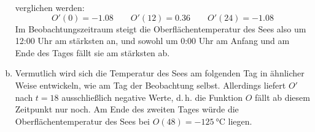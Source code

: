 \begin{exercise}
\begin{enumerate}[a)]
            verglichen werden:
            \begin{equation*}
              O'(\num{0})=-\num{1.08}
              \qquad
              O'(\num{12})=\num{0.36}
              \qquad
              O'(\num{24})=-\num{1.08}
            \end{equation*}
            Im Beobachtungszeitraum steigt die
            Oberflächentemperatur des Sees also
            um 12:00 Uhr am stärksten an, und
            sowohl um 0:00 Uhr am Anfang und am
            Ende des Tages fällt sie am stärksten ab.
      \item Vermutlich wird sich die Temperatur
            des Sees am folgenden Tag in ähnlicher
            Weise entwickeln, wie am Tag der
            Beobachtung selbst.
            Allerdings liefert $O'$ nach $t=18$
            ausschließlich negative Werte, d.\,h.
            die Funktion $O$ fällt ab diesem
            Zeitpunkt nur noch.
            Am Ende des zweiten Tages würde die
            Oberflächentemperatur des Sees bei
            $O(48)=\SI{-125}{\celsius}$ liegen.
    \end{enumerate}
  \fi
\end{exercise}
